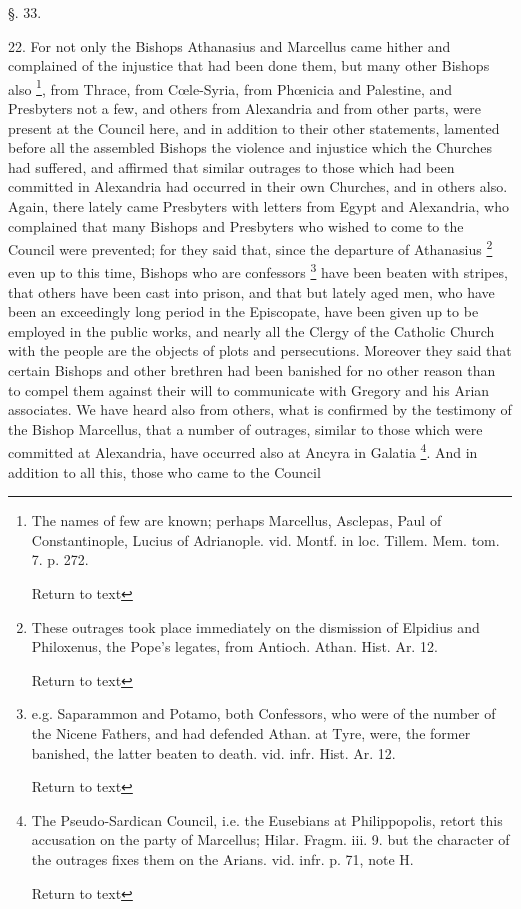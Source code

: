 §. 33.

22. For not only the Bishops Athanasius and
Marcellus came hither and complained of the injustice that had been
done them, but many other Bishops also \footnote{The names of few are known; perhaps Marcellus, Asclepas, Paul of
Constantinople, Lucius of Adrianople. vid. Montf. in loc. Tillem. Mem.
tom. 7. p. 272.

Return to text}, from Thrace, from Cœle-Syria, from Phœnicia and Palestine,
and Presbyters not a few, and others from Alexandria and from other
parts, were present at the Council here, and in addition to their
other statements, lamented before all the assembled Bishops the
violence and injustice which the Churches had suffered, and affirmed
that similar outrages to those which had been committed in Alexandria
had occurred in their own Churches, and in others also. Again, there
lately came Presbyters with letters from Egypt and Alexandria, who
complained that many Bishops and Presbyters who wished to come to the
Council were prevented; for they said that, since the departure of
Athanasius \footnote{These outrages took place immediately on the dismission of Elpidius
and Philoxenus, the Pope's legates, from Antioch. Athan. Hist. Ar. 12.

Return to text} even up to
this time, Bishops who are confessors \footnote{e.g. Saparammon and Potamo, both Confessors, who were of the number of
the Nicene Fathers, and had defended Athan. at Tyre, were, the former
banished, the latter beaten to death. vid. infr. Hist. Ar. 12.

Return to text} have been beaten with stripes, that others have been cast into
prison, and that but lately aged men, who have been an exceedingly
long period in the Episcopate, have been given up to be employed
in the public works, and nearly all the Clergy of the Catholic Church
with the people are the objects of plots and persecutions. Moreover
they said that certain Bishops and other brethren had been banished
for no other reason than to compel them against their will to
communicate with Gregory and his Arian associates. We have heard also
from others, what is confirmed by the testimony of the Bishop
Marcellus, that a number of outrages, similar to those which were
committed at Alexandria, have occurred also at Ancyra in Galatia \footnote{The Pseudo-Sardican Council, i.e. the Eusebians at Philippopolis,
retort this accusation on the party of Marcellus; Hilar. Fragm. iii.
9. but the character of the outrages fixes them on the Arians. vid.
infr. p. 71, note H.

Return to text}. And in addition to all this, those who came to the Council
